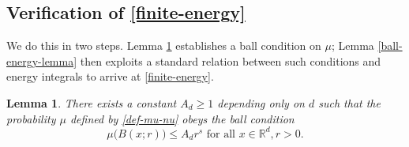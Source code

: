 \documentclass[a4paper,11pt]{amsart}
\newtheorem{lem}[thm]{\bf Lemma}
\numberwithin{equation}{section}
\begin{document}
\subsection{Verification of \eqref{finite-energy}} \label{finite-energy-verification} We do this in two steps. Lemma \ref{ball-condition-lemma} establishes a ball condition on $\mu$; Lemma \ref{ball-energy-lemma} then exploits a standard relation between such conditions and energy integrals to arrive at \eqref{finite-energy}.   
\begin{lem} \label{ball-condition-lemma} 
There exists a constant $A_d \geq 1$ depending only on $d$ such that the probability $\mu$ defined by \eqref{def-mu-nu} obeys the ball condition
\begin{equation} \label{ball-condition} 
\mu \bigl(B(x;r)\bigr) \leq A_d r^s \text{ for all } x \in \mathbb R^d, r > 0.  
\end{equation}  
\end{lem} 
\end{document}
